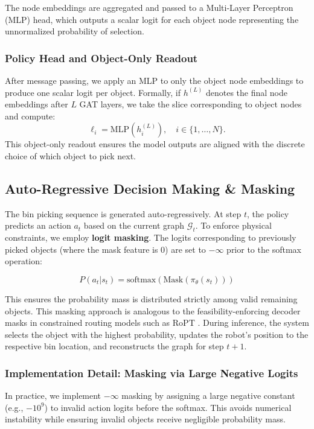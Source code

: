 \documentclass[conference]{IEEEtran}
\begin{document}
The node embeddings are aggregated and passed to a Multi-Layer Perceptron (MLP) head, which outputs a scalar logit for each object node representing the unnormalized probability of selection.

\subsubsection{Policy Head and Object-Only Readout}
After message passing, we apply an MLP to only the object node embeddings to produce one scalar logit per object.
Formally, if $h^{(L)}$ denotes the final node embeddings after $L$ GAT layers, we take the slice corresponding to object nodes and compute:
\begin{equation}
\ell_i = \text{MLP}(h^{(L)}_i), \quad i \in \{1,\dots,N\}. 
\end{equation}
This object-only readout ensures the model outputs are aligned with the discrete choice of which object to pick next.

\subsection{Auto-Regressive Decision Making \& Masking}
The bin picking sequence is generated auto-regressively. At step $t$, the policy predicts an action $a_t$ based on the current graph $\mathcal{G}_t$. To enforce physical constraints, we employ \textbf{logit masking}. The logits corresponding to previously picked objects (where the mask feature is $0$) are set to $-\infty$ prior to the softmax operation:

\begin{equation}
    P(a_t | s_t) = \text{softmax}(\text{Mask}(\pi_\theta(s_t)))
\end{equation}

This ensures the probability mass is distributed strictly among valid remaining objects. This masking approach is analogous to the feasibility-enforcing decoder masks in constrained routing models such as RoPT \cite{xiong2025ropt}. During inference, the system selects the object with the highest probability, updates the robot's position to the respective bin location, and reconstructs the graph for step $t+1$.

\subsubsection{Implementation Detail: Masking via Large Negative Logits}
In practice, we implement $-\infty$ masking by assigning a large negative constant (e.g., $-10^9$) to invalid action logits before the softmax.
This avoids numerical instability while ensuring invalid objects receive negligible probability mass.
\end{document}
